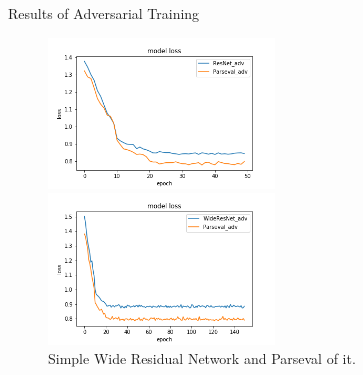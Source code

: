 \documentclass{beamer}		%
\begin{document}
\begin{frame}{Results of Adversarial Training}
\begin{figure}[!htb]
    
   \begin{minipage}{0.48\textwidth}
     \centering
     \includegraphics[height=4cm,width=.9\linewidth]{compare_ResNetvsParseval_adversarial_loss.png}
      \caption{Simple ResNet and Parseval of it.}
   \end{minipage}\hfill
   \begin{minipage}{0.48\textwidth}
     \centering
     \includegraphics[height=4cm,width=.9\linewidth]{compare_ResNetvsParseval_adversarial_for_advanceModel_loss.png}
     \caption{Simple Wide Residual Network and Parseval of it.}
   \end{minipage}
\end{figure}
\end{frame}
\end{document}
